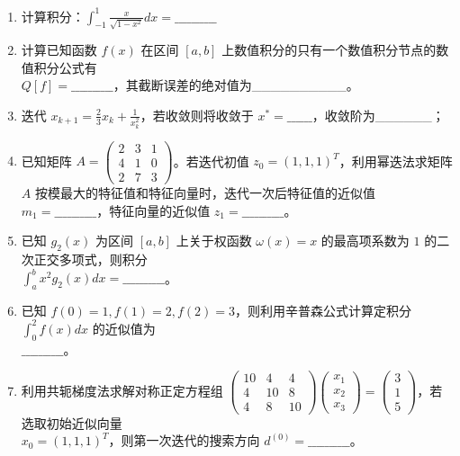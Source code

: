 \documentclass[12pt,a4paper]{article}
\begin{document}
\begin{enumerate}
        \item 计算积分：$\int_{-1}^{1} \frac{x}{\sqrt{1-x^2}}dx = \_\_\_\_\_\_\_\_\_\_$
        
        \item 计算已知函数 $f(x)$ 在区间 $[a,b]$ 上数值积分的只有一个数值积分节点的数值积分公式有 \\
        $Q[f] = \_\_\_\_\_\_\_\_\_\_$，其截断误差的绝对值为\_\_\_\_\_\_\_\_\_\_。
        
        \item 迭代 $x_{k+1} = \frac{2}{3}x_k + \frac{1}{x_k^2}$，若收敛则将收敛于 $x^* = \_\_\_\_\_\_$，收敛阶为\_\_\_\_\_\_；
        
        \item 已知矩阵 $A = \begin{pmatrix} 2 & 3 & 1 \\ 4 & 1 & 0 \\ 2 & 7 & 3 \end{pmatrix}$。若迭代初值 $z_0 = (1,1,1)^T$，利用幂迭法求矩阵 $A$ 按模最大的特征值和特征向量时，迭代一次后特征值的近似值 $m_1 = \_\_\_\_\_\_\_\_\_\_$，特征向量的近似值 $z_1 = \_\_\_\_\_\_\_\_\_\_$。
        
        \item 已知 $g_2(x)$ 为区间 $[a,b]$ 上关于权函数 $\omega(x) = x$ 的最高项系数为 $1$ 的二次正交多项式，则积分 \\
        $\int_a^b x^2 g_2(x) dx = \_\_\_\_\_\_\_\_\_\_$。
        
        \item 已知 $f(0) = 1, f(1) = 2, f(2) = 3$，则利用辛普森公式计算定积分 $\int_0^2 f(x)dx$ 的近似值为 \\
        $\_\_\_\_\_\_\_\_\_\_$。
        
        \item 利用共轭梯度法求解对称正定方程组 $\begin{pmatrix} 10 & 4 & 4 \\ 4 & 10 & 8 \\ 4 & 8 & 10 \end{pmatrix} \begin{pmatrix} x_1 \\ x_2 \\ x_3 \end{pmatrix} = \begin{pmatrix} 3 \\ 1 \\ 5 \end{pmatrix}$，若选取初始近似向量 \\
        $x_0 = (1,1,1)^T$，则第一次迭代的搜索方向 $d^{(0)} = \_\_\_\_\_\_\_\_\_\_$。
        

\end{enumerate}
\end{document}
